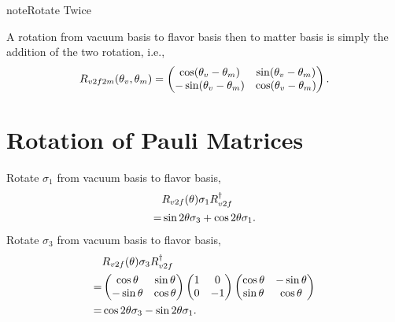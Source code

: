 \documentclass[letterpaper,12pt,english]{sphinxmanual}
\begin{document}
\begin{notice}{note}{Rotate Twice}

A rotation from vacuum basis to flavor basis then to matter basis is simply the addition of the two rotation, i.e.,
\begin{gather}
\begin{split}R_{v2f2m}(\theta_v,\theta_m) = \begin{pmatrix} \cos(\theta_v - \theta_m) & \sin ( \theta_v - \theta_m ) \\ -\sin (\theta_v-\theta_m) & \cos (\theta_v - \theta_m) \end{pmatrix}.\end{split}\notag
\end{gather}\end{notice}


\section{Rotation of Pauli Matrices}
\label{basis:rotation-of-pauli-matrices}
Rotate \(\sigma_1\) from vacuum basis to flavor basis,
\begin{gather}
\begin{split}&R_{v2f}(\theta) \sigma_1 R_{v2f}^{\dagger} \\
=& \sin 2\theta \sigma_3 + \cos 2\theta \sigma_1.\end{split}\notag
\end{gather}
Rotate \(\sigma_3\) from vacuum basis to flavor basis,
\begin{gather}
\begin{split}&R_{v2f}(\theta) \sigma_3 R_{v2f}^{\dagger} \\
=&  \begin{pmatrix} \cos \theta & \sin \theta \\ -\sin \theta & \cos\theta \end{pmatrix} \begin{pmatrix} 1 & 0 \\ 0 & -1 \end{pmatrix} \begin{pmatrix} \cos \theta & -\sin \theta \\ \sin \theta & \cos\theta \end{pmatrix} \\
=& \cos 2\theta \sigma_3 - \sin 2\theta \sigma_1.\end{split}\notag
\end{gather}
\end{document}
